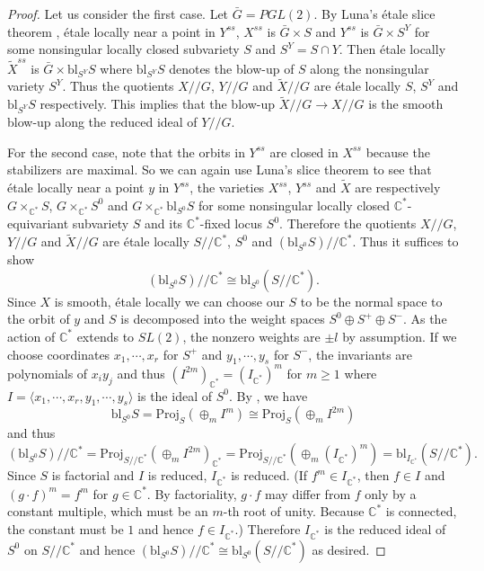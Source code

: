 \documentclass[10pt]{amsart}
\theoremstyle{definition}
\newcommand{\CC}{\mathbb{C}}
\def\git{/\!/ }
\begin{document}
\begin{proof} Let us consider the first case. Let $\bar
G=PGL(2)$. By Luna's \'etale slice theorem \cite[Appendix 1.D]{MFK},
\'etale locally near a point in $Y^{ss}$, $X^{ss}$ is
$\bar{G}\times S$ and $Y^{ss}$ is $\bar{G}\times S^Y$ for some
nonsingular locally closed subvariety $S$ and $S^Y=S\cap Y$. Then
\'etale locally $\widetilde{X}^{ss}$ is $\bar{G}\times
\mathrm{bl}_{S^Y}S$ where $\mathrm{bl}_{S^Y}S$ denotes the blow-up
of $S$ along the nonsingular variety $S^Y$. Thus the quotients
$X\git G$, $Y\git G$ and $\widetilde{X}\git G$ are \'etale locally
$S$, $S^Y$ and $\mathrm{bl}_{S^Y}S$ respectively. This implies
that the blow-up $\widetilde{X}\git G\to X\git G$ is the smooth
blow-up along the reduced ideal of $Y\git G$.

For the second case, note that the orbits in $Y^{ss}$ are closed
in $X^{ss}$ because the stabilizers are maximal. So we can again
use Luna's slice theorem to see that \'etale locally near a point
$y$ in $Y^{ss}$, the varieties $X^{ss}$, $Y^{ss}$ and
$\widetilde{X}$ are respectively $G\times_{\CC^*}S$,
$G\times_{\CC^*}S^0$ and $G\times_{\CC^*}\mathrm{bl}_{S^0}S$ for
some nonsingular locally closed $\CC^*$-equivariant subvariety $S$
and its $\CC^*$-fixed locus $S^0$. Therefore the quotients $X\git
G$, $Y\git G$ and $\widetilde{X}\git G$ are \'etale locally $S\git
\CC^*$, $S^0$ and $(\mathrm{bl}_{S^0}S)\git \CC^*$. Thus it
suffices to show
$$(\mathrm{bl}_{S^0}S)\git \CC^*\cong
\mathrm{bl}_{S^0}(S\git \CC^*).$$ Since $X$ is smooth, \'etale
locally we can choose our $S$ to be the normal space to the orbit
of $y$ and $S$ is decomposed into the weight spaces $S^0\oplus
S^+\oplus S^-$. As the action of $\CC^*$ extends to $SL(2)$, the
nonzero weights are $\pm l$ by assumption. If we choose
coordinates $x_1,\cdots, x_r$ for $S^+$ and $y_1,\cdots, y_s$ for
$S^-$, the invariants are polynomials of $x_iy_j$ and thus
$(I^{2m})_{\CC^*}=(I_{\CC^*})^m$ for $m\ge 1$ where $I=\langle
x_1,\cdots,x_r,y_1,\cdots,y_s \rangle$ is the ideal of $S^0$. By
\cite[II Exe. 7.11]{Hartshorne}, we have
$$\mathrm{bl}_{S^0}S=\mathrm{Proj}_S(\oplus_m I^m)\cong
\mathrm{Proj}_S(\oplus_m I^{2m})$$ and thus
$$(\mathrm{bl}_{S^0}S)\git \CC^*
=\mathrm{Proj}_{S\git \CC^*}(\oplus_m I^{2m})_{\CC^*}
=\mathrm{Proj}_{S\git \CC^*}\left(\oplus_m
(I_{\CC^*})^{m}\right)=\mathrm{bl}_{I_{\CC^*}}(S\git \CC^*).$$
Since $S$ is factorial and $I$ is reduced, $I_{\CC^*}$ is reduced.
(If $f^m\in I_{\CC^*}$, then $f\in I$ and $(g\cdot f)^m=f^m$ for
$g\in \CC^*$. By factoriality, $g\cdot f$ may differ from $f$ only
by a constant multiple, which must be an $m$-th root of unity.
Because $\CC^*$ is connected, the constant must be $1$ and hence
$f\in I_{\CC^*}$.) Therefore $I_{\CC^*}$ is the reduced ideal of
$S^0$ on $S\git \CC^*$ and hence $(\mathrm{bl}_{S^0}S)\git
\CC^*\cong \mathrm{bl}_{S^0}(S\git \CC^*)$ as desired.


\end{proof}
\end{document}
